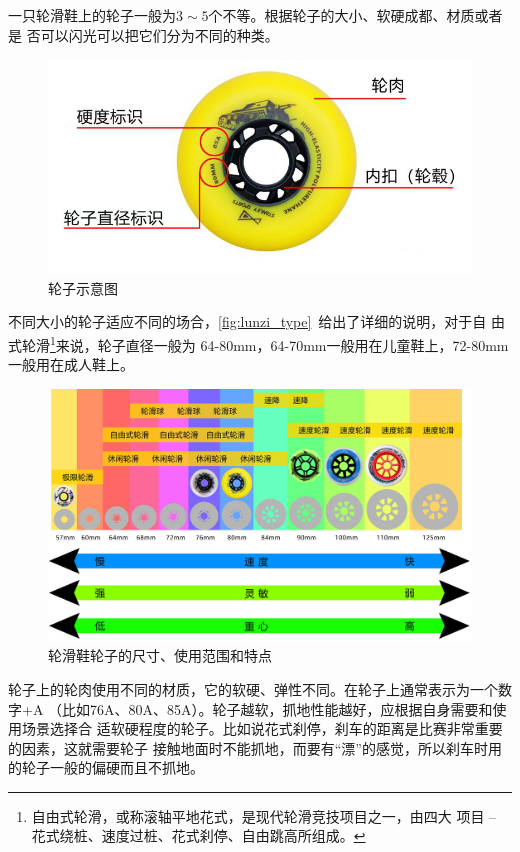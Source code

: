 \documentclass[12pt]{ctexart}
\begin{document}
\begin{paracol}{2}
一只轮滑鞋上的轮子一般为$3\sim 5$个不等。根据轮子的大小、软硬成都、材质或者是
否可以闪光可以把它们分为不同的种类。
\begin{rightcolumn}
\begin{figure}[htpb]
  \centering
  \includegraphics[width=\linewidth]{lunzi.jpg}
  \caption{轮子示意图\cite{zhihu:skating1}}
\end{figure}
\end{rightcolumn}
\end{paracol}
不同大小的轮子适应不同的场合，\autoref{fig:lunzi_type}~给出了详细的说明，对于自
由式轮滑\footnote{自由式轮滑，或称滚轴平地花式，是现代轮滑竞技项目之一，由四大
项目 – 花式绕桩、速度过桩、花式刹停、自由跳高所组成。}来说，轮子直径一般为
64-80\si{mm}，64-70\si{mm}一般用在儿童鞋上，72-80\si{mm}一般用在成人鞋上。

\begin{figure}[htpb]
  \centering
  \includegraphics[width=\linewidth]{lunzi_type.jpg}
  \caption{轮滑鞋轮子的尺寸、使用范围和特点\cite{zhihu:skating1}}
  \label{fig:lunzi_type}
\end{figure}

轮子上的轮肉使用不同的材质，它的软硬、弹性不同。在轮子上通常表示为一个数字+A
（比如76A、80A、85A）。轮子越软，抓地性能越好，应根据自身需要和使用场景选择合
适软硬程度的轮子。比如说花式刹停，刹车的距离是比赛非常重要的因素，这就需要轮子
接触地面时不能抓地，而要有“漂”的感觉，所以刹车时用的轮子一般的偏硬而且不抓地。
\end{document}
